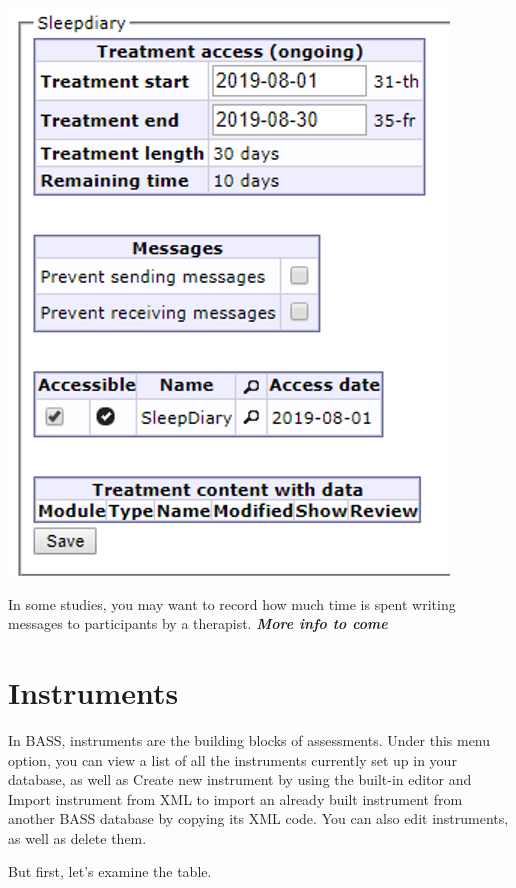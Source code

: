 \documentclass[]{book}
\begin{document}
\includegraphics{images/new-images/participantTreatAccess.png}

In some studies, you may want to record how much time is spent writing messages to participants by a therapist. \emph{\textbf{More info to come}}

\hypertarget{instruments}{%
\chapter{Instruments}\label{instruments}}

In BASS, instruments are the building blocks of assessments. Under this menu option, you can view a list of all the instruments currently set up in your database, as well as Create new instrument by using the built-in editor and Import instrument from XML to import an already built instrument from another BASS database by copying its XML code. You can also edit instruments, as well as delete them.

But first, let's examine the table.
\end{document}

